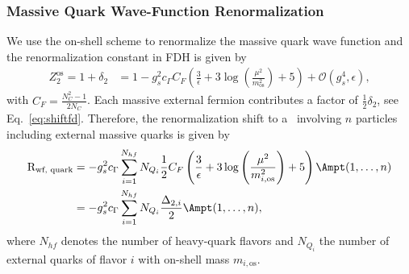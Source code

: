 \subsubsection{Massive Quark Wave-Function Renormalization}
 We use the on-shell scheme to renormalize the massive quark wave
 function and the renormalization constant in FDH is given by
\begin{align}
 Z_2^{\text{os}}=1+\delta_2&=1-g_s^2c_\Gamma C_F\left(\frac{3}{\epsilon}+3\log{\left(\frac{\mu^2}{m_{\text{os}}^2}\right)}+5\right)+\mathcal{O}(g_s^4,\epsilon),
\end{align}
with $C_F=\frac{N_C^2-1}{2N_C}$. 
Each massive external fermion
contributes a factor of $\frac{1}{2}\delta_2$, see Eq.~\eqref{eq:shiftfd}. Therefore, the
renormalization shift to a \ola~involving $n$ particles including external massive quarks is given by
\begin{align}
\begin{split}
  \text{R}_{\text{wf, quark}} &= -g_s^{2}c_\Gamma
\sum_{i=1}^{N_{hf}}N_{Q_i}\frac{1}{2}C_F\left(\frac{3}{\epsilon}+3\log{\left(\frac{\mu^2}{m_{i,\text{os}}^2}\right)}+5\right)\Ampt(1,\dots,n)\\
&= -g_s^{2}c_\Gamma
\sum_{i=1}^{N_{hf}}N_{Q_i}\frac{\Delta_{2,i}}{2}\Ampt(1,\dots,n),
\end{split}
\end{align}
where $N_{hf}$ denotes the number of heavy-quark flavors and $N_{Q_i}$ the number of external quarks of flavor $i$ with on-shell mass $m_{i,\text{os}}$.



